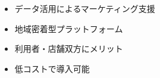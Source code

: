 \begin{itemize}
  \item データ活用によるマーケティング支援
  \item 地域密着型プラットフォーム
  \item 利用者・店舗双方にメリット
  \item 低コストで導入可能
\end{itemize}   